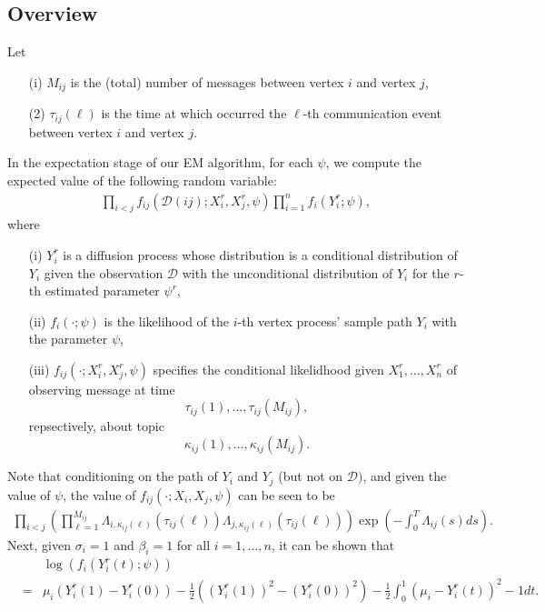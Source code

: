 \documentclass[12pt]{article}%
\begin{document}
\subsection{Overview}
Let
\begin{enumerate}
\item[(i)] $M_{ij}$ is the (total) number of messages between vertex $i$ and vertex $j$,
\item[(2)] $\tau_{ij}(\ell)$ is the time at which occurred the $\ell$-th communication event  between vertex $i$ and vertex $j$.
\end{enumerate}
In the expectation stage of our EM algorithm, for each $\psi$, we compute the expected value of the following random variable:
\begin{eqnarray}
\prod_{i<j} f_{ij}(\mathcal D(ij);X_i^r,X_j^r,\psi) \prod_{i=1}^n f_{i}(Y_i^r;\psi),
\end{eqnarray}
where 
\begin{enumerate}
\item[(i)] $Y_i^r$ is a diffusion process whose distribution is a conditional distribution of $Y_i$ given the observation $\mathcal D$ with the unconditional distribution of $Y_i$ for the $r$-th estimated parameter $\psi^r$,
\item[(ii)] $f_{i}(\cdot;\psi)$ is the likelihood of the $i$-th vertex 
process' sample path $Y_i$ with the parameter $\psi$,
\item[(iii)] $f_{ij}(\cdot;X_i^r,X_j^r,\psi)$ specifies the conditional likelidhood given $X_1^r,\ldots,X_n^r$ of 
observing message at time 
$$
\tau_{ij}(1),\ldots, \tau_{ij}(M_{ij}),
$$
repsectively, about topic 
$$
\kappa_{ij}(1),\ldots, \kappa_{ij}(M_{ij}).
$$
\end{enumerate}

   
Note that conditioning on the path of $Y_i$ and $Y_j$ (but not on $\mathcal D)$, and given the value of $\psi$, the value of $f_{ij}(\cdot;X_i,X_j,\psi)$ can be seen to be
\begin{eqnarray}\label{formula2010.12.19.12.31.pm}
\prod_{i<j} \left(\prod_{\ell=1}^{M_{ij}} \Lambda_{i,\kappa_{ij}(\ell)}(\tau_{ij}(\ell))\Lambda_{j,\kappa_{ij}(\ell)}(\tau_{ij}(\ell))\right) \exp\left(-\int_0^T \Lambda_{ij}(s) ds\right).
\end{eqnarray}
Next, given $\sigma_i=1$ and $\beta_i=1$ for all $i=1,\ldots, n$, 
it can be shown that
\begin{eqnarray*}
&\ &\log (f_i(Y_{i}^r(t);\psi))\\
&= & \mu_i (Y_{i}^r(1) - Y_{i}^r(0)) - \frac{1}{2} ((Y_{i}^r(1))^2 - (Y_i^r(0))^2) - \frac{1}{2} \int_0^1 (\mu_i-Y_{i}^r(t))^2 - 1 dt. 
\end{eqnarray*}
\end{document}
